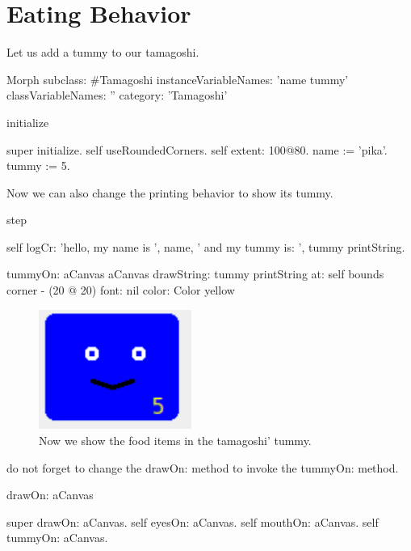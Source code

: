 \documentclass[a4paper,10pt,twoside]{book}
\begin{document}
\section{Eating Behavior}


Let us add a tummy to our tamagoshi. 

\begin{code}{}
Morph subclass: #Tamagoshi
	instanceVariableNames: 'name tummy'
	classVariableNames: ''
	category: 'Tamagoshi'
\end{code}

\begin{code}{}
initialize

	super initialize. 
	self useRoundedCorners.
	self extent: 100@80.
	name := 'pika'.
	tummy := 5.
\end{code}


Now we can also change the printing behavior to show its tummy.

\begin{code}{}
step

	self logCr: 'hello, my name is ', name, ' and my tummy is: ', tummy printString.
\end{code}

\begin{code}{}
tummyOn: aCanvas
	aCanvas
		drawString: tummy printString
		at: self bounds corner - (20 @ 20)
		font: nil
		color: Color yellow
\end{code}

\begin{figure}
\begin{center}
\includegraphics[width=5cm]{figures/withbBelly}
\caption{Now we show the food items in the tamagoshi' tummy.\label{withbBelly}}
\end{center}
\end{figure}



do not forget to change the drawOn: method to invoke the tummyOn: method.
\begin{code}{}
drawOn: aCanvas

	super drawOn: aCanvas.
	self eyesOn: aCanvas.
	self mouthOn: aCanvas.
	self tummyOn: aCanvas. 
\end{code}
\end{document}
